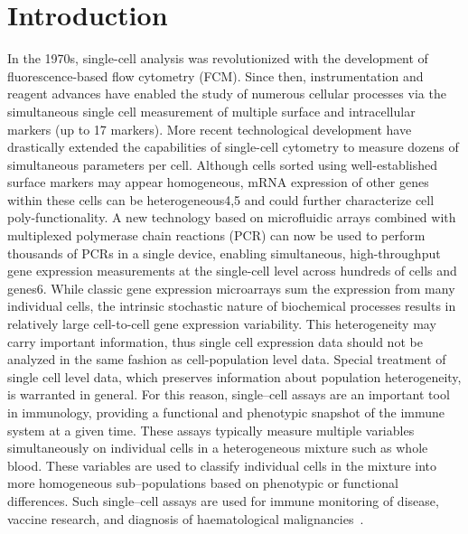 \documentclass[11pt]{article}
\begin{document}
\section{Introduction}
In the 1970s, single-cell analysis was revolutionized with the development of fluorescence-based flow cytometry (FCM). Since then, instrumentation and reagent advances have enabled the study of numerous cellular processes via the simultaneous single cell measurement of multiple surface and intracellular markers (up to 17 markers). More recent technological development have drastically extended the capabilities of single-cell cytometry to measure dozens of simultaneous parameters per cell. Although cells sorted using well-established surface markers may appear homogeneous, mRNA expression of other genes within these cells can be heterogeneous4,5 and could further characterize cell poly-functionality. A new technology based on microfluidic arrays combined with multiplexed polymerase chain reactions (PCR) can now be used to perform thousands of PCRs in a single device, enabling simultaneous, high-throughput gene expression measurements at the single-cell level across hundreds of cells and genes6. While classic gene expression microarrays sum the expression from many individual cells, the intrinsic stochastic nature of biochemical processes results in relatively large cell-to-cell gene expression variability. This heterogeneity may carry important information, thus single cell expression data should not be analyzed in the same fashion as cell-population level data. Special treatment of single cell level data, which preserves information about population heterogeneity, is warranted in general. For this reason, single--cell assays are an important tool in immunology, providing a functional and phenotypic snapshot of the immune system at a given time. These assays typically measure multiple variables simultaneously on individual cells in a heterogeneous mixture such as whole blood. These variables are used to classify individual cells in the mixture into more homogeneous sub--populations based on phenotypic or functional differences. Such single--cell assays are used for immune monitoring of disease, vaccine research, and diagnosis of haematological malignancies~\cite{Altman:1996wf,Betts:2006dw,Inokuma:2007tn}.
\end{document}
